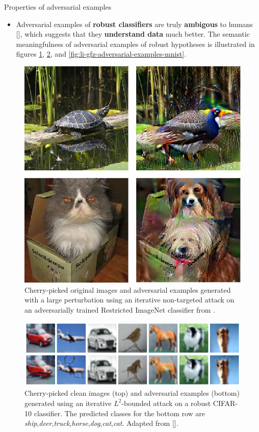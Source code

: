 \documentclass{beamer}
\newcommand{\citet}[1]{{\color{citecolor}\relscale{0.8}\textcite{#1}}}
\newcommand{\citep}[1]{{\color{citecolor}\relscale{0.8}[\textcite{#1}]}}
\begin{document}
\begin{frame}[allowframebreaks=0.9]{Properties of adversarial examples}
	\begin{itemize}
		\item Adversarial examples of \textbf{robust classifiers} are truly \textbf{ambigous} to humans \citep{Tsipras:2018:RMBOA,Li:2019:AGCMRAA}, which suggests that they \textbf{understand data} much better. The semantic meaningfulness of adversarial examples of robust hypotheses is illustrated in figures \ref{fig:tsipras-robust-adversarial-examples}, \ref{fig:rony-cifar10-cherry-picked}, and \ref{fig:li-gfz-adversarial-examples-mnist}.
	\end{itemize}
	\begin{figure}
		\begin{center}
			\includegraphics[width=0.5\columnwidth]{figures/adversarial-examples/tsipras-turtle-bird-cat-dogs}
		\end{center}
		\caption{Cherry-picked original images and adversarial examples generated with a large perturbation using an iterative non-targeted attack on an adversarially trained Restricted ImageNet classifier from \citet{Tsipras:2018:RMBOA}.}
		\label{fig:tsipras-robust-adversarial-examples}
	\end{figure}
	
	\begin{figure}
		\begin{center}
			\includegraphics[width=\textwidth]{figures/adversarial-examples/rony/cifar10_cherry_picked}
		\end{center}
		\caption{Cherry-picked clean images (top) and adversarial examples (bottom) generated using an iterative $L^2$-bounded attack on a robust CIFAR-10 classifier. The predicted classes for the bottom row are \textit{ship},\textit{deer},\textit{truck},\textit{horse},\textit{dog},\textit{cat},\textit{cat}. Adapted from \citep{Rony:2018:DDNEGBLAAD}.}
		\label{fig:rony-cifar10-cherry-picked}
	\end{figure}
	

\end{frame}
\end{document}
